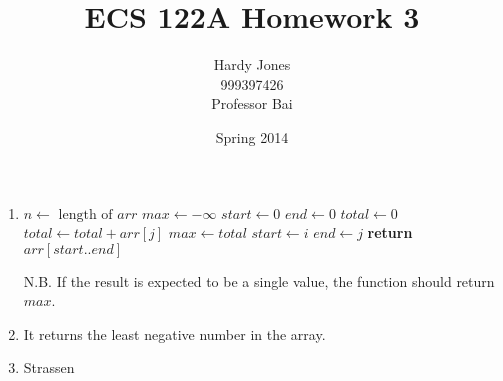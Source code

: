 \documentclass[12pt,letterpaper]{article}
\title{ECS 122A Homework 3\vspace{-2ex}}
\author{Hardy Jones\\
        999397426\\
        Professor Bai\vspace{-2ex}}
\date{Spring 2014}
\newcommand{\Let}[2]{\State $#1 \gets #2$}
\begin{document}
  \maketitle

  \begin{enumerate}
    \item
      \begin{algorithm}
        \begin{algorithmic}[1]
            \Let{n}{\textrm{ length of }arr}
            \Let{max}{-\infty}
            \Let{start}{0}
            \Let{end}{0}
              \Let{total}{0}
                \Let{total}{total + arr[j]}
                  \Let{max}{total}
                  \Let{start}{i}
                  \Let{end}{j}
                \EndIf
              \EndFor
            \EndFor
            \State \textbf{return} $arr[start..end]$
          \EndFunction
        \end{algorithmic}
      \end{algorithm}

      N.B. If the result is expected to be a single value,
      the function should return $max$.
    \item
      It returns the least negative number in the array.

    \item
      Strassen


\end{enumerate}
\end{document}
